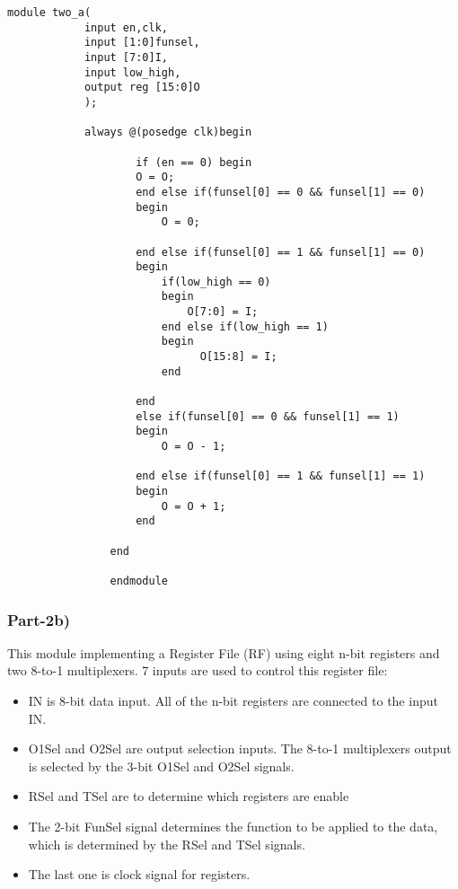 \documentclass[12pt]{article}
\begin{document}
\vspace{0.5cm}
\begin{lstlisting}
module two_a(
            input en,clk,
            input [1:0]funsel,
            input [7:0]I,
            input low_high,
            output reg [15:0]O
            );
         
            always @(posedge clk)begin
                    
                    if (en == 0) begin
                    O = O;
                    end else if(funsel[0] == 0 && funsel[1] == 0)
                    begin
                        O = 0;
                        
                    end else if(funsel[0] == 1 && funsel[1] == 0)
                    begin
                        if(low_high == 0)
                        begin
                            O[7:0] = I;
                        end else if(low_high == 1)
                        begin
                              O[15:8] = I;
                        end
                        
                    end
                    else if(funsel[0] == 0 && funsel[1] == 1)
                    begin
                        O = O - 1;
                        
                    end else if(funsel[0] == 1 && funsel[1] == 1)
                    begin
                        O = O + 1;
                    end
                    
                end
                
                endmodule  
\end{lstlisting}              

\clearpage


\subsubsection{Part-2b)}
This module implementing a Register File (RF) using eight n-bit registers and two 8-to-1 multiplexers. 7 inputs are used to control this register file:
\begin{itemize}
    \item IN is 8-bit data input. All of the n-bit registers are connected to the input IN.
    \item O1Sel and O2Sel are output selection inputs. The 8-to-1 multiplexers output is selected by the 3-bit O1Sel and O2Sel signals.
    \item RSel and TSel are to determine which registers are enable
    \item  The 2-bit FunSel signal determines the function to be applied to the data, which is determined by the RSel and TSel signals.   
    \item The last one is clock signal for registers.
    \end{itemize}
\end{document}
